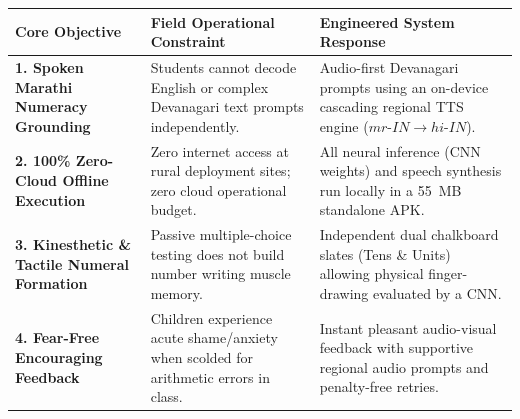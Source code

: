 \documentclass[10pt,a4paper]{article}
\begin{document}
\begin{table}[h!]
\centering
\scriptsize
\renewcommand{\arraystretch}{1.12}
\begin{tabularx}{\textwidth}{@{}p{3.2cm} p{5.3cm} X@{}}
\toprule
\rowcolor{primary!10}
\textbf{Core Objective} & \textbf{Field Operational Constraint} & \textbf{Engineered System Response} \\
\midrule
\textbf{1. Spoken Marathi Numeracy Grounding} & Students cannot decode English or complex Devanagari text prompts independently. & Audio-first Devanagari prompts using an on-device cascading regional TTS engine ($mr\text{-}IN \rightarrow hi\text{-}IN$). \\
\textbf{2. 100\% Zero-Cloud Offline Execution} & Zero internet access at rural deployment sites; zero cloud operational budget. & All neural inference (CNN weights) and speech synthesis run locally in a 55~MB standalone APK. \\
\textbf{3. Kinesthetic \& Tactile Numeral Formation} & Passive multiple-choice testing does not build number writing muscle memory. & Independent dual chalkboard slates (Tens \& Units) allowing physical finger-drawing evaluated by a CNN. \\
\textbf{4. Fear-Free Encouraging Feedback} & Children experience acute shame/anxiety when scolded for arithmetic errors in class. & Instant pleasant audio-visual feedback with supportive regional audio prompts and penalty-free retries. \\
\bottomrule
\end{tabularx}
\end{table}

\clearpage

\end{document}
